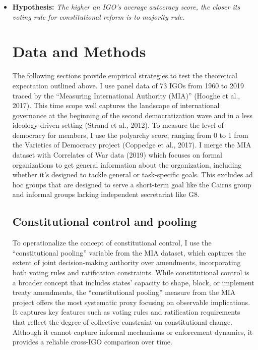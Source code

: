 \documentclass[12pt]{article}
\begin{document}
\begin{itemize}
  \item \textbf{Hypothesis:} \textit{The higher an IGO’s average autocracy score, the closer its voting rule for constitutional reform is to majority rule.}


\section{Data and Methods}
The following sections provide empirical strategies to test the theoretical expectation outlined above. I use panel data of 73 IGOs from 1960 to 2019 traced by the “Measuring International Authority (MIA)” (Hooghe et al., 2017). This time scope well captures the landscape of international governance at the beginning of the second democratization wave and in a less ideology-driven setting (Strand et al., 2012). To measure the level of democracy for members, I use the polyarchy score, ranging from 0 to 1 from the Varieties of Democracy project (Coppedge et al., 2017). I merge the MIA dataset with Correlates of War data (2019) which focuses on formal organizations to get general information about the organization, including whether it’s designed to tackle general or task-specific goals. This excludes ad hoc groups that are designed to serve a short-term goal like the Cairns group and informal groups lacking independent secretariat like G8.


\subsection{Constitutional control and pooling}

To operationalize the concept of constitutional control, I use the “constitutional pooling” variable from the MIA dataset, which captures the extent of joint decision-making authority over amendments, incorporating both voting rules and ratification constraints. While constitutional control is a broader concept that includes states’ capacity to shape, block, or implement treaty amendments, the “constitutional pooling” measure from the MIA project offers the most systematic proxy focusing on observable implications. It captures key features such as voting rules and ratification requirements that reflect the degree of collective constraint on constitutional change. Although it cannot capture informal mechanisms or enforcement dynamics, it provides a reliable cross-IGO comparison over time.


\end{itemize}
\end{document}
